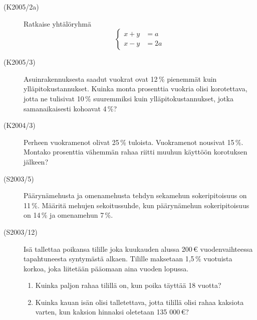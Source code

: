 \begin{description}
    \item[(K2005/2a)]  Ratkaise yhtälöryhmä
                       \[
                         \left\{
                         \begin{matrix}
                              x + y &= a \\
                              x - y &= 2a
                         \end{matrix}
                         \right.
                       \]
    \item[(K2005/3)]   Asuinrakennuksesta saadut vuokrat ovat 12\,\% pienemmät kuin ylläpitokustannukset. Kuinka monta prosenttia 
                       vuokria olisi korotettava, jotta ne tulisivat 10\,\% suuremmiksi kuin ylläpitokustannukset, jotka
                       samanaikaisesti kohoavat 4\,\%?
    \item[(K2004/3)]   Perheen vuokramenot olivat 25\,\% tuloista. Vuokramenot nousivat 15\,\%. Montako prosenttia vähemmän rahaa
                       riitti muuhun käyttöön korotuksen jälkeen?
    \item[(S2003/5)]   Päärynämehusta ja omenamehusta tehdyn sekamehun sokeripitoisuus on 11\,\%. Määritä mehujen sekoitussuhde,
                       kun päärynämehun sokeripitoisuus on 14\,\% ja omenamehun 7\,\%.
    \item[(S2003/12)]  Isä tallettaa poikansa tilille joka kuukauden alussa 200\,\euro \; vuodenvaihteessa tapahtuneesta syntymästä
                       alkaen. Tilille maksetaan 1,5\,\% vuotuista korkoa, joka liitetään pääomaan aina vuoden lopussa.
                       
                       \begin{enumerate}
                           \item Kuinka paljon rahaa tilillä on, kun poika täyttää 18 vuotta? 
                           \item Kuinka kauan isän olisi talletettava, jotta tilillä olisi rahaa kaksiota varten, kun kaksion
                                 hinnaksi oletetaan 135 000\,\euro ?
                       \end{enumerate}
                       

\end{description}
